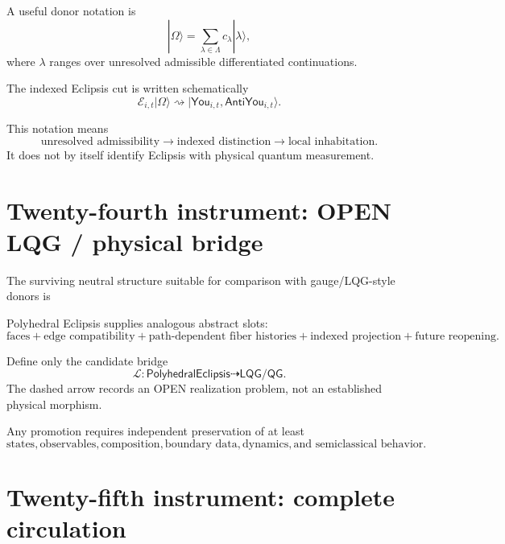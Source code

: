 \documentclass[10pt]{article}
\theoremstyle{pe}
\theoremstyle{definition}
\newcommand{\You}{\mathsf{You}}
\newcommand{\AntiYou}{\mathsf{AntiYou}}
\begin{document}
A useful donor notation is
\[
  |\Omega\rangle
  =
  \sum_{\lambda\in\Lambda}
  c_\lambda|\lambda\rangle,
\]
where \(\lambda\) ranges over unresolved admissible differentiated continuations.

The indexed Eclipsis cut is written schematically
\begin{equation}\label{eq:superposition-cut}
  \boxed{
  \mathcal E_{i,t}|\Omega\rangle
  \rightsquigarrow
  |\You_{i,t},\AntiYou_{i,t}\rangle.
  }
\end{equation}

This notation means
\[
  \text{unresolved admissibility}
  \to
  \text{indexed distinction}
  \to
  \text{local inhabitation}.
\]
It does not by itself identify Eclipsis with physical quantum measurement.

\section{Twenty-fourth instrument: OPEN LQG / physical bridge}

The surviving neutral structure suitable for comparison with gauge/LQG-style donors is
\begin{center}
\end{center}

Polyhedral Eclipsis supplies analogous abstract slots:
\[
  \text{faces}
  +
  \text{edge compatibility}
  +
  \text{path-dependent fiber histories}
  +
  \text{indexed projection}
  +
  \text{future reopening}.
\]

Define only the candidate bridge
\[
  \boxed{
  \mathcal L:
  \mathsf{PolyhedralEclipsis}
  \dashrightarrow
  \mathsf{LQG/QG}.
  }
\]
The dashed arrow records an OPEN realization problem, not an established physical morphism.

Any promotion requires independent preservation of at least
\[
  \text{states},
  \text{observables},
  \text{composition},
  \text{boundary data},
  \text{dynamics},
  \text{and semiclassical behavior}.
\]

\section{Twenty-fifth instrument: complete circulation}
\end{document}
